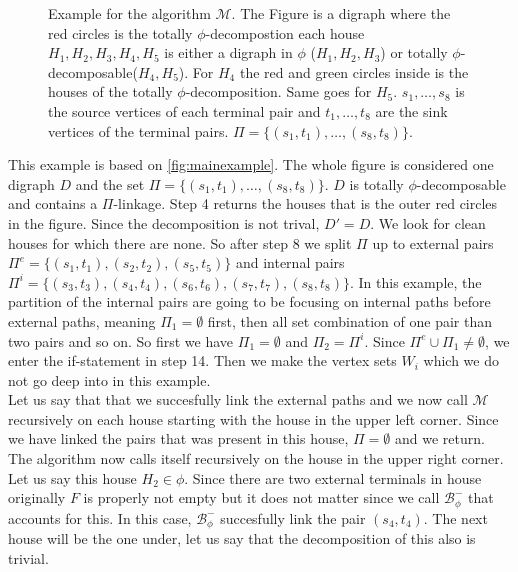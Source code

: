 \begin{figure}
\begin{tikzpicture}
    \end{tikzpicture}
    \caption{Example for the algorithm $\mathcal{M}$. The Figure is a digraph where the red circles is the totally $\phi$-decompostion each house $H_1,H_2,H_3,H_4,H_5$ is either a digraph in $\phi$ ($H_1,H_2,H_3$) or totally $\phi$-decomposable($H_4,H_5$). For $H_4$ the red and green circles inside is the houses of the totally $\phi$-decomposition. Same goes for $H_5$.
    $s_1,\dots ,s_8$ is the source vertices of each terminal pair and $t_1,\dots ,t_8$ are the sink vertices of the terminal pairs. 
    $\Pi=\lbrace (s_1,t_1),\dots ,(s_8,t_8)\rbrace$.}
    \label{fig:mainexample}
\end{figure}
\begin{example}
    This example  is based on \autoref{fig:mainexample}.
    The whole figure is considered one digraph $D$ and the set $\Pi = \lbrace (s_1,t_1),\dots ,(s_8,t_8)\rbrace$.
    $D$ is totally $\phi$-decomposable and contains a $\Pi$-linkage. 
    Step 4 returns the houses that is the outer red circles in the figure. 
    Since the decomposition is not trival, $D'=D$. 
    We look for clean houses for which there are none. So after step 8 we split $\Pi$ up to external pairs $\Pi^e=\lbrace (s_1,t_1),(s_2,t_2),(s_5,t_5)\rbrace$ and internal pairs $\Pi^i=\lbrace (s_3,t_3), (s_4,t_4), (s_6,t_6),(s_7,t_7),(s_8,t_8)\rbrace$. 
    In this example, the partition of the internal pairs are going to be focusing on internal paths before external paths, meaning $\Pi_1=\emptyset$ first, then all set combination of one pair than two pairs and so on.
    So first we have $\Pi_1=\emptyset$ and $\Pi_2=\Pi^i$.
    Since $\Pi^e\cup \Pi_1\neq \emptyset$, we enter the if-statement in step 14. 
    Then we make the vertex sets $W_i$ which we do not go deep into in this example.\\ 
    Let us say that that we succesfully link the external paths and we now call $\mathcal{M}$ recursively on each house starting with the house in the upper left corner.
    Since we have linked the pairs that was present in this house, $\Pi=\emptyset$ and we return. 
    The algorithm now calls itself recursively on the house in the upper right corner.
    Let us say this house $H_2\in \phi$. Since there are two external terminals in house originally $F$ is properly not empty but it does not matter since we call $\mathcal{B}_{\phi}^-$ that accounts for this.
    In this case, $\mathcal{B}_{\phi}^-$ succesfully link the pair $(s_4,t_4)$.  
    The next house will be the one under, let us say that the decomposition of this also is trivial. 

\end{example}
